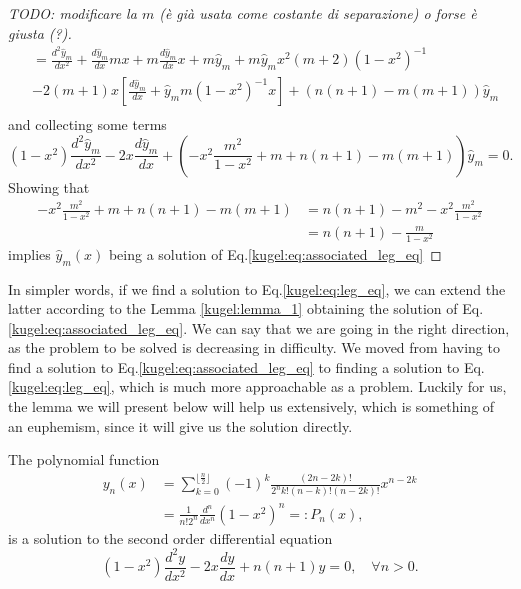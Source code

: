 \begin{proof} [TODO: modificare la $m$ (è già usata come costante di separazione) o forse è giusta (?)]
\begin{align*}
    &= \frac{d^2\hat{y}_m}{dx^2} + \frac{d\hat{y}_m}{dx}mx + m\frac{d\hat{y}_m}{dx}x + m\hat{y}_m + m\hat{y}_m x^2(m+2)(1-x^2)^{-1} \\
    &-2(m+1)x\left[  \frac{d\hat{y}_m}{dx} + \hat{y}_mm(1-x^2)^{-1}x \right] + (n(n+1)-m(m+1))\hat{y}_m\\
    \end{align*}
    and collecting some terms
    \begin{equation*}
    (1-x^2)\frac{d^2\hat{y}_m}{dx^2} - 2x\frac{d\hat{y}_m}{dx} + \left( -x^2 \frac{m^2}{1-x^2} + m+n(n+1)-m(m+1)\right)\hat{y}_m=0.
    \end{equation*}
    Showing that 
    \begin{align*}
    -x^2 \frac{m^2}{1-x^2} + m+n(n+1)-m(m+1) &= n(n+1)- m^2 -x^2 \frac{m^2}{1-x^2} \\
    &= n(n+1)- \frac{m}{1-x^2}
    \end{align*}
    implies $\hat{y}_m(x)$ being a solution of Eq.\eqref{kugel:eq:associated_leg_eq}
\end{proof}
In simpler words, if we find a solution to Eq.\eqref{kugel:eq:leg_eq}, we can extend the latter according to the Lemma \ref{kugel:lemma_1} obtaining the solution of Eq.\eqref{kugel:eq:associated_leg_eq}.\newline
We can say that we are going in the right direction, as the problem to be solved is decreasing in difficulty. We moved from having to find a solution to Eq.\eqref{kugel:eq:associated_leg_eq} to finding a solution to Eq.\eqref{kugel:eq:leg_eq}, which is much more approachable as a problem. Luckily for us, the lemma we will present below will help us extensively, which is something of an euphemism, since it will give us the solution directly.
\begin{lemma}
    The polynomial function
    \begin{align*}
        y_n(x)&=\sum_{k=0}^{\lfloor \frac{n}{2} \rfloor} (-1)^k \frac{(2n-2k)!}{2^n k! (n-k)!(n-2k)!} x^{n-2k}\\
        &= \frac{1}{n!2^n}\frac{d^n}{dx^n}(1-x^2)^n =: P_n(x),
    \end{align*}
    is a solution to the second order differential equation
    \begin{equation}\label{kugel:eq:sol_leg}
        (1-x^2)\frac{d^2y}{dx^2}-2x\frac{dy}{dx} + n(n+1)y=0, \quad \forall n>0.
    \end{equation}
\end{lemma}
